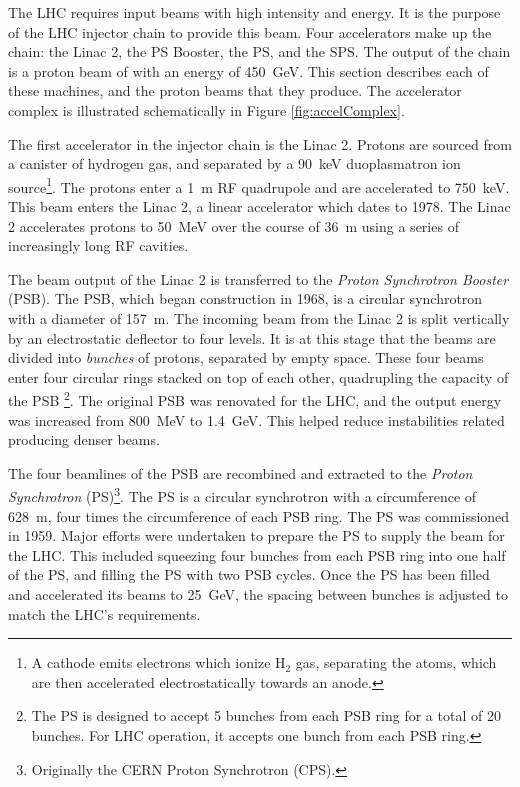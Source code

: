 The LHC requires input beams with high intensity and energy.
It is the purpose of the LHC injector chain to provide this beam.
Four accelerators make up the chain: the Linac 2, the PS Booster, the PS, and the SPS.
The output of the chain is a proton beam of with an energy of 450~GeV.
This section describes each of these machines, and the proton beams that they produce.\cite{schindl}
The accelerator complex is illustrated schematically in Figure \ref{fig:accelComplex}.

The first accelerator in the injector chain is the Linac 2.
Protons are sourced from a canister of hydrogen gas, and separated by a 90~keV duoplasmatron ion source\footnote{A cathode emits electrons which ionize H$_2$ gas, separating the atoms, which are then accelerated electrostatically towards an anode.}.
The protons enter a 1~m RF quadrupole and are accelerated to 750~keV.
This beam enters the Linac 2, a linear accelerator which dates to 1978.
The Linac 2 accelerates protons to 50~MeV over the course of 36~m using a series of increasingly long RF cavities. \cite{manglunki}

The beam output of the Linac 2 is transferred to the \emph{Proton Synchrotron Booster} (PSB).
The PSB, which began construction in 1968, is a circular synchrotron with a diameter of 157~m.
The incoming beam from the Linac 2 is split vertically by an electrostatic deflector to four levels.
It is at this stage that the beams are divided into \emph{bunches} of protons, separated by empty space.
These four beams enter four circular rings stacked on top of each other, quadrupling the capacity of the PSB \footnote{The PS is designed to accept 5 bunches from each PSB ring for a total of 20 bunches. For LHC operation, it accepts one bunch from each PSB ring.}. \cite{reich}
The original PSB was renovated for the LHC, and the output energy was increased from 800~MeV to 1.4~GeV. 
This helped reduce instabilities related producing denser beams.
\cite{schindl}

The four beamlines of the PSB are recombined and extracted to the \emph{Proton Synchrotron} (PS)\footnote{Originally the CERN Proton Synchrotron (CPS).}.
The PS is a circular synchrotron with a circumference of 628~m, four times the circumference of each PSB ring. 
The PS was commissioned in 1959.
Major efforts were undertaken to prepare the PS to supply the beam for the LHC.
This included squeezing four bunches from each PSB ring into one half of the PS, and filling the PS with two PSB cycles.
Once the PS has been filled and accelerated its beams to 25~GeV, the spacing between bunches is adjusted to match the LHC's requirements.\cite{schindl}

